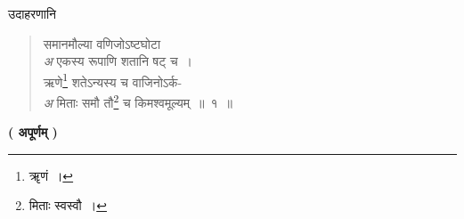 \documentclass[11pt, openany]{book}
\begin{document}
उदाहरणानि \textendash 

\begin{quote}
{\color{red}समानमौल्या वणिजोऽष्टघोटा \\
\emph{\color{white}अ} \hspace{2mm} एकस्य रूपाणि शतानि षट् च~। \\
ऋणे\renewcommand{\thefootnote}{५}\footnote{ॠणं~।} शतेऽन्यस्य च वाजिनोऽर्क- \\
\emph{\color{white}अ} \hspace{2mm} मिताः समौ तौ\renewcommand{\thefootnote}{६}\footnote{मिताः स्वस्वौ~।} च किमश्वमूल्यम्~॥~१~॥}
\end{quote}

\begin{center}
\textbf{( अपूर्णम् )}
\end{center}
\vspace{10cm}
\end{document}
